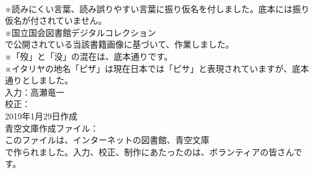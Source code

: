 \documentclass[8pt]{extreport}
\begin{document}
\begin{CJK}{UTF8}{min}
\\	※読みにくい言葉、読み誤りやすい言葉に振り仮名を付しました。底本には振り仮名が付されていません。
\\	※国立国会図書館デジタルコレクション
\\	で公開されている当該書籍画像に基づいて、作業しました。
\\	※「歿」と「没」の混在は、底本通りです。
\\	※イタリヤの地名「ピザ」は現在日本では「ピサ」と表現されていますが、底本通りとしました。
\\	入力：高瀬竜一
\\	校正：
\\	2019年1月29日作成
\\	青空文庫作成ファイル：
\\	このファイルは、インターネットの図書館、青空文庫
\\	で作られました。入力、校正、制作にあたったのは、ボランティアの皆さんです。
\end{CJK}
\end{document}
